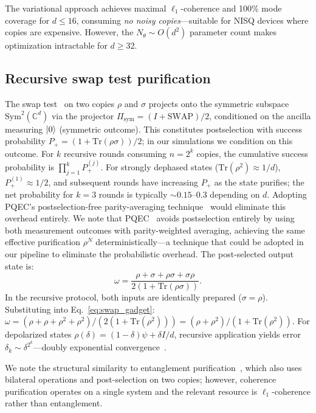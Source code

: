 \documentclass[pra,twocolumn,superscriptaddress,longbibliography,floatfix]{revtex4-2}
\begin{document}
The variational approach achieves maximal $\ell_1$-coherence and 100\% mode coverage for $d \leq 16$, consuming \emph{no noisy copies}---suitable for NISQ devices where copies are expensive.
However, the $N_\theta \sim O(d^2)$ parameter count makes optimization intractable for $d \geq 32$.


\subsection{Recursive swap test purification}
\label{sec:swap_test}

The swap test~\cite{Childs2025,Barenco1997} on two copies $\rho$ and $\sigma$ projects onto the symmetric subspace $\mathrm{Sym}^2(\mathbb{C}^d)$ via the projector $\Pi_\mathrm{sym} = (I + \mathrm{SWAP})/2$, conditioned on the ancilla measuring $\ket{0}$ (symmetric outcome).
This constitutes postselection with success probability $P_+ = (1 + \mathrm{Tr}(\rho\sigma))/2$; in our simulations we condition on this outcome.
For $k$ recursive rounds consuming $n = 2^k$ copies, the cumulative success probability is $\prod_{j=1}^k P_+^{(j)}$.
For strongly dephased states ($\mathrm{Tr}(\rho^2) \approx 1/d$), $P_+^{(1)} \approx 1/2$, and subsequent rounds have increasing $P_+$ as the state purifies; the net probability for $k = 3$ rounds is typically $\sim\!0.15$--$0.3$ depending on $d$.
Adopting PQEC's postselection-free parity-averaging technique~\cite{Raghoonanan2026} would eliminate this overhead entirely.
We note that PQEC~\cite{Raghoonanan2026} avoids postselection entirely by using both measurement outcomes with parity-weighted averaging, achieving the same effective purification $\rho^N$ deterministically---a technique that could be adopted in our pipeline to eliminate the probabilistic overhead.
The post-selected output state is:
\begin{equation}
\omega = \frac{\rho + \sigma + \rho\sigma + \sigma\rho}{2(1 + \mathrm{Tr}(\rho\sigma))}.
\label{eq:swap_gadget}
\end{equation}
In the recursive protocol, both inputs are identically prepared ($\sigma = \rho$).
Substituting into Eq.~\eqref{eq:swap_gadget}: $\omega = (\rho + \rho + \rho^2 + \rho^2)/(2(1 + \mathrm{Tr}(\rho^2))) = (\rho + \rho^2)/(1 + \mathrm{Tr}(\rho^2))$.
For depolarized states $\rho(\delta) = (1-\delta)\psi + \delta I/d$, recursive application yields error $\delta_k \sim \delta^{2^k}$---doubly exponential convergence~\cite{Childs2025}.

We note the structural similarity to entanglement purification~\cite{Bennett1996}, which also uses bilateral operations and post-selection on two copies; however, coherence purification operates on a single system and the relevant resource is $\ell_1$-coherence rather than entanglement.
\end{document}
